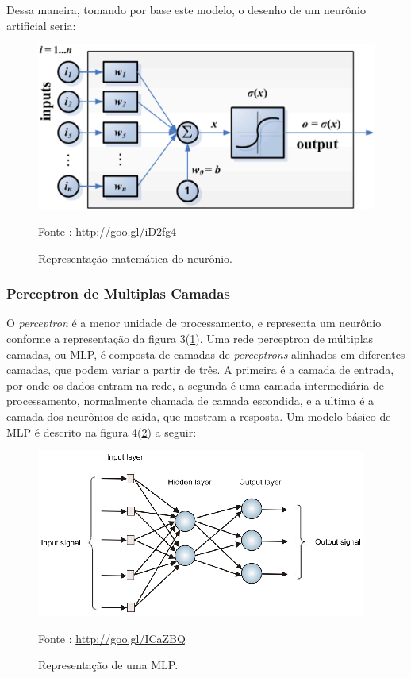     Dessa maneira, tomando por base este modelo, o desenho de um neurônio artificial seria:

    \begin{figure}[ht]
        \centering
        \label{fig03}
            \includegraphics[keepaspectratio=true, scale=0.27]{editaveis/images/modeloNeuronio.eps}
        \caption{Representação matemática do neurônio.}
        Fonte : \url{http://goo.gl/iD2fg4}
    \end{figure}
    \newpage

\subsubsection{Perceptron de Multiplas Camadas}
    O \textit{perceptron} é a menor unidade de processamento, e representa um neurônio conforme a representação da figura 3(\ref{fig03}). Uma rede perceptron de múltiplas camadas, ou MLP, é composta de camadas de \textit{perceptrons} alinhados em diferentes camadas, que podem variar a partir de três. A primeira é a camada de entrada, por onde os dados entram na rede, a segunda é uma camada intermediária de processamento, normalmente chamada de camada escondida, e a ultima é a camada dos neurônios de saída, que mostram a resposta. Um modelo básico de MLP é descrito na figura 4(\ref{fig04}) a seguir:

    \begin{figure}[ht]
        \centering
        \label{fig04}
            \includegraphics[keepaspectratio=true, scale=2.1]{editaveis/images/mlp.eps}
        \caption{Representação de uma MLP.}
        Fonte : \url{http://goo.gl/ICaZBQ}
    \end{figure}


